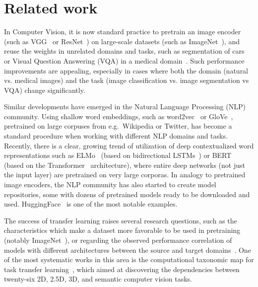 \section{Related work}


In Computer Vision, it is now standard practice to pretrain an image encoder (such as VGG~\cite{simonyan2014very} or ResNet~\cite{he2016deep}) on large-scale datasets (such as ImageNet~\cite{deng2009imagenet}), and reuse the weights in unrelated domains and tasks, such as segmentation of cars~\cite{iglovikov2018ternausnet} or Visual Question Answering (VQA) in a medical domain~\cite{kornuta2019leveraging}.
Such performance improvements are appealing, especially in cases where both the domain (natural vs. medical images) and the task (image classification vs. image segmentation vs VQA) change significantly. %

Similar developments have emerged in the Natural Language Processing (NLP) community.
Using shallow word embeddings, such as word2vec~\cite{mikolov2013distributed} or GloVe~\cite{pennington2014glove}, pretrained on large corpuses from e.g.\ Wikipedia or Twitter, has become a standard procedure when working with different NLP domains and tasks.
Recently, there is a clear, growing trend of utilization of deep contextualized word representations such as ELMo~\cite{peters2018deep} (based on bidirectional LSTMs~\cite{hochreiter1997long}) or BERT~\cite{devlin2018bert} (based on the Transformer~\cite{vaswani2017attention} architecture), where entire deep networks (not just the input layer) are pretrained on very large corporas.
In analogy to pretrained image encoders, the NLP community has also started to create model repositories, some with dozens of pretrained models ready to be downloaded and used. HuggingFace~\cite{wolf2019transformers} is one of the most notable examples.

The success of transfer learning raises several research questions, such as the characteristics which make a dataset more favorable to be used in pretraining (notably ImageNet~\cite{huh2016makes}), or regarding the observed performance correlation of models with different architectures between the source and target domains~\cite{kornblith2019better}.
One of the most systematic works in this area is the computational taxonomic map for task transfer learning~\cite{zamir2018taskonomy}, which aimed at discovering the dependencies between twenty-six 2D, 2.5D, 3D, and semantic computer vision tasks.


